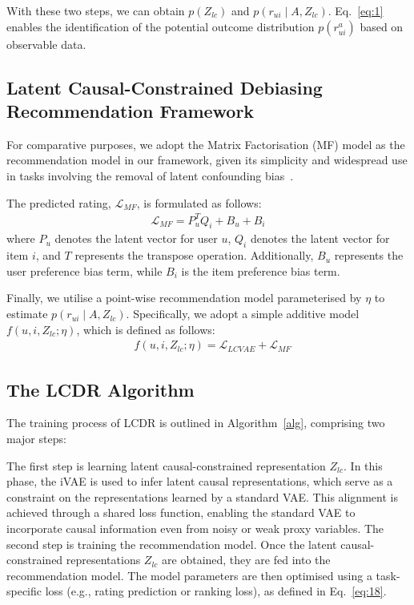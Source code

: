 \documentclass[sigconf]{acmart}
\begin{document}
With these two steps, we can obtain $p\left({Z_{lc}}\right)$ and $p\left(r_{u i} \mid {A}, {Z_{lc}}\right)$.
Eq.~\ref{eq:1} enables the identification of the potential outcome distribution $p\left(r_{u i}^a\right)$ based on observable data.


\subsection{Latent Causal-Constrained Debiasing Recommendation Framework}
For comparative purposes, we adopt the Matrix Factorisation (MF) model as the recommendation model in our framework, given its simplicity and widespread use in tasks involving the removal of latent confounding bias~\cite{23,29,idcf}.

The predicted rating, $\mathcal{L}_{MF}$, is formulated as follows:
\begin{equation}
\begin{split}
\mathcal{L}_{MF} ={P}_u^T {Q}_i + {B}_u + {B}_i
\end{split}
\end{equation} 
where ${P}_u$ denotes the latent vector for user $u$, ${Q}_i$ denotes the latent vector for item $i$, and $T$ represents the transpose operation. Additionally, ${B}_u$ represents the user preference bias term, while ${B}_i$ is the item preference bias term.

Finally, we utilise a point-wise recommendation model parameterised by \(\eta\) to estimate 
\(p\left(r_{ui} \mid {A}, {Z_{lc}}\right)\). Specifically, we adopt a simple additive model \(f(u, i, {Z_{lc}} ; \eta)\), which is defined as follows:
\begin{equation}
\begin{split}
\label{eq:18}
&f(u, i, {Z_{lc}} ; \eta) = \mathcal{L}_{LCVAE}  + \mathcal{L}_{MF}
\end{split}
\end{equation} 





\subsection{The LCDR Algorithm}

The training process of LCDR is outlined in Algorithm~\ref{alg}, comprising two major steps:

The first step is learning latent causal-constrained representation $Z_{lc}$.
In this phase, the iVAE is used to infer latent causal representations, which serve as a constraint on the representations learned by a standard VAE. This alignment is achieved through a shared loss function, enabling the standard VAE to incorporate causal information even from noisy or weak proxy variables.
The second step is training the recommendation model.
Once the latent causal-constrained representations $Z_{lc}$ are obtained, they are fed into the recommendation model. The model parameters are then optimised using a task-specific loss (e.g., rating prediction or ranking loss), as defined in Eq.~\ref{eq:18}. 
 
\end{document}
